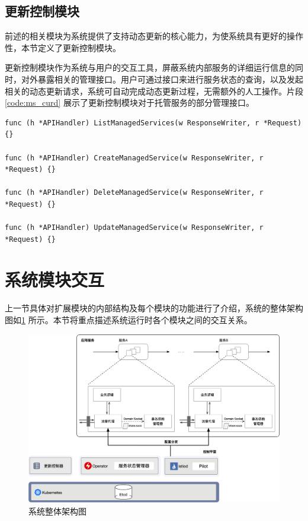 \documentclass[macfonts,master]{njuthesis}
\begin{document}
\subsection{更新控制模块}
前述的相关模块为系统提供了支持动态更新的核心能力，为使系统具有更好的操作性，本节定义了更新控制模块。

更新控制模块作为系统与用户的交互工具，屏蔽系统内部服务的详细运行信息的同时，对外暴露相关的管理接口。用户可通过接口来进行服务状态的查询，以及发起相关的动态更新请求，系统可自动完成动态更新过程，无需额外的人工操作。片段\ref{code:ms_curd} 展示了更新控制模块对于托管服务的部分管理接口。


\begin{lstlisting}[caption={部分接口示例}, label={code:ms_curd}, style=golangStyle]
func (h *APIHandler) ListManagedServices(w ResponseWriter, r *Request) {}

func (h *APIHandler) CreateManagedService(w ResponseWriter, r *Request) {}

func (h *APIHandler) DeleteManagedService(w ResponseWriter, r *Request) {}

func (h *APIHandler) UpdateManagedService(w ResponseWriter, r *Request) {}
\end{lstlisting}

\section{系统模块交互}
上一节具体对扩展模块的内部结构及每个模块的功能进行了介绍，系统的整体架构图如\ref{fig:sys_arch} 所示。本节将重点描述系统运行时各个模块之间的交互关系。

\begin{figure}[!htbp]
  \centering
  \includegraphics[width= 1.0\textwidth]{image/sys_arch.png}
  \caption{系统整体架构图}
  \label{fig:sys_arch}
\end{figure}
\end{document}
